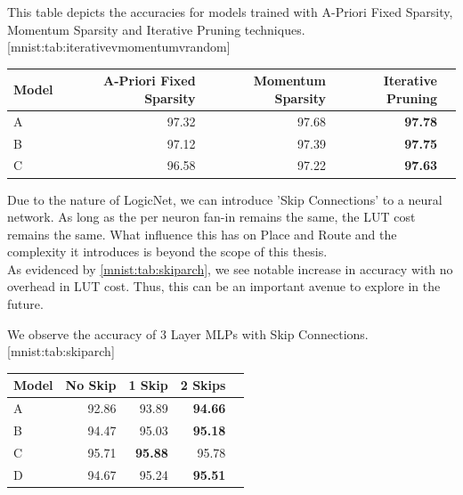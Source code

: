 \begin{table}
    \begin{sidecaption}{%
        This table depicts the accuracies for models trained with A-Priori Fixed Sparsity, Momentum Sparsity and Iterative Pruning techniques. 
    }[mnist:tab:iterativevmomentumvrandom]
\begin{threeparttable}
\begin{tabular}{lrrrr}
\hline
Model & A-Priori Fixed Sparsity & Momentum Sparsity & Iterative Pruning \\ \hline
A     &  97.32             &          97.68        & \textbf{97.78}     \\
B     &  97.12             &          97.39    & \textbf{97.75}    \\
C     &  96.58             &          97.22    & \textbf{97.63}          \\    \hline 
    \end{tabular}
\end{threeparttable}
\end{sidecaption}
\end{table}

Due to the nature of LogicNet, we can introduce 'Skip Connections' to a neural network. As long as the per neuron fan-in remains the same, the LUT cost remains the same. What influence this has on Place and Route and the complexity it introduces is beyond the scope of this thesis. \\
As evidenced by \cref{mnist:tab:skiparch}, we see notable increase in accuracy with  no overhead in LUT cost. Thus, this can be an important avenue to explore in the future.


\begin{table}
    \begin{sidecaption}{%
        We observe the accuracy of 3 Layer MLPs with Skip Connections. 
    }[mnist:tab:skiparch]
\begin{threeparttable}
\begin{tabular}{lrrrr}
\hline
Model & No Skip & 1 Skip & 2 Skips            \\ \hline
A     &  92.86  & 93.89  & \textbf{94.66}     \\
B     &  94.47  & 95.03  & \textbf{95.18}     \\
C     &  95.71  & \textbf{95.88}  & 95.78      \\
D     &  94.67  & 95.24  & \textbf{95.51}      \\    \hline 
    \end{tabular}
\end{threeparttable}
\end{sidecaption}
\end{table}

